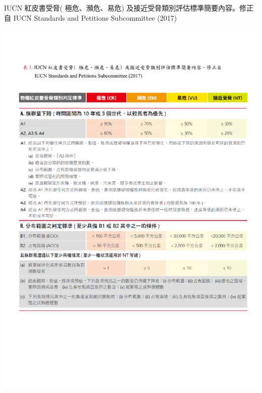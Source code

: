 \begin{table}[!ht]
\caption{IUCN 紅皮書受脅( 極危、瀕危、易危) 及接近受脅類別評估標準簡要內容。修正自 IUCN Standards and Petitions Subcommittee (2017)} \label{table1}
\includegraphics[scale=0.9]{iucn_standards.pdf}
\end{table}
